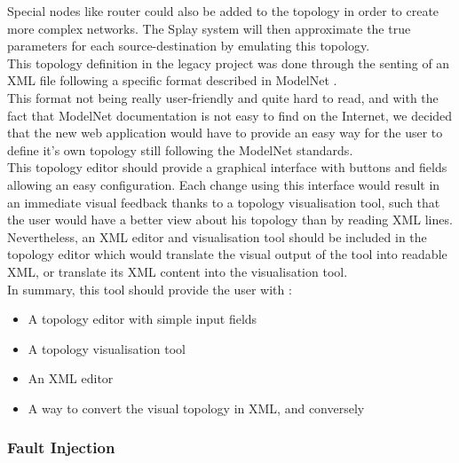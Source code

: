 \documentclass{eplmastersthesis}
\begin{document}
          Special nodes like router could also be added to the topology in order
          to create more complex networks. The Splay system will then
          approximate the true parameters for each source-destination by
          emulating this topology.\\

          This topology definition in the legacy project was done through
          the senting of an XML file following a specific format described
          in ModelNet \cite{ModelNet}.\\
          This format not being really user-friendly and quite hard to read,
          and with the fact that ModelNet documentation is not easy to find
          on the Internet, we decided that the new web application would have
          to provide an easy way for the user to define it's own topology
          still following the ModelNet standards.\\

          This topology editor should provide a graphical interface with
          buttons and fields allowing an easy configuration. Each change
          using this interface would result in an immediate visual feedback
          thanks to a topology visualisation tool, such that the user would
          have a better view about his topology than by reading XML lines.
          Nevertheless, an XML editor and visualisation tool should be included
          in the topology editor which would translate the visual output of
          the tool into readable XML, or translate its XML content into the
          visualisation tool.\\

          In summary, this tool should provide the user with :

          \begin{itemize}
            \item A topology editor with simple input fields
            \item A topology visualisation tool
            \item An XML editor
            \item A way to convert the visual topology in XML, and conversely
          \end{itemize}

        \subsubsection{Fault Injection}
\end{document}
